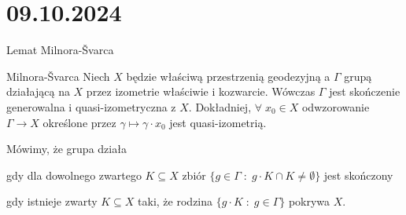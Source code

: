 \section{09.10.2024}{Lemat Milnora-\v{S}varca}

\begin{lemma}{Milnora-\v{S}varca}{}
  Niech $X$ będzie właściwą przestrzenią geodezyjną a $\Gamma$ grupą działającą na $X$ przez izometrie właściwie i kozwarcie. Wówczas $\Gamma$ jest skończenie generowalna i quasi-izometryczna z $X$. Dokładniej, $\forall\;x_0\in X$ odwzorowanie $\Gamma\to X$ określone przez $\gamma\mapsto \gamma\cdot x_0$ jest quasi-izometrią.
\end{lemma}

Mówimy, że grupa działa
\begin{description}[format=\color{orange}]
  \item[właściwie,] gdy dla dowolnego zwartego $K\subseteq X$ zbiór $\{g\in\Gamma\;:\;g\cdot K\cap K\neq \emptyset\}$ jest skończony
  \item[kozwarcie,] gdy istnieje zwarty $K\subseteq X$ taki, że rodzina $\{g\cdot K\;:\;g\in\Gamma\}$ pokrywa $X$.
\end{description}


